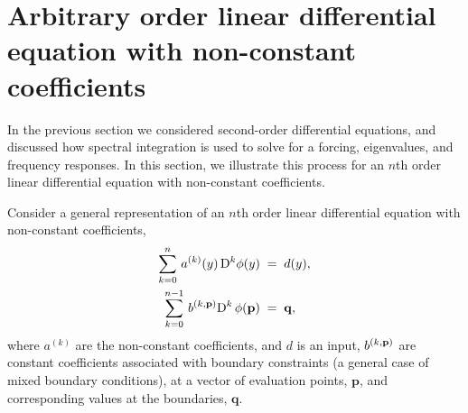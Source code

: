 \documentclass[%
secnumarabic,%
 amssymb, amsmath,%
 aps,prf,superscriptaddress,longbibliography
frontmatterverbose,
]{revtex4-2}
\begin{document}
	\vspace*{-4ex}
\section{Arbitrary order linear differential equation with non-constant coefficients}

	\vspace*{-2ex}
In the previous section we considered second-order differential equations, and discussed how spectral integration is used to solve for a forcing, eigenvalues, and frequency responses. In this section, we illustrate this process for an $n$th order linear differential equation with non-constant coefficients. 

Consider a general representation of an $n$th order linear differential equation with non-constant coefficients,
\begin{subequations}\label{eq1:1}
\begin{align}
    \sum_{k = 0}^{n}\, a^{(k)}(y)\, \mathrm D^k \phi (y) \;&=\; d(y),\label{eq:1a}\\
    \sum_{k = 0}^{n-1}\,b^{(k,\mathbf p)}\mathrm D^k\,\phi (\mathbf p) \;&=\; \mathbf q,\label{eq:1b}
\end{align}
\end{subequations}
where $a^{(k)}$ are the non-constant coefficients, and $d$ is an input, $b^{(k,\mathbf{p})}$ are constant coefficients associated with boundary constraints (a general case of mixed boundary conditions), at a vector of evaluation points, $\mathbf p$, and corresponding values at the boundaries, $\mathbf q$. 
\end{document}
